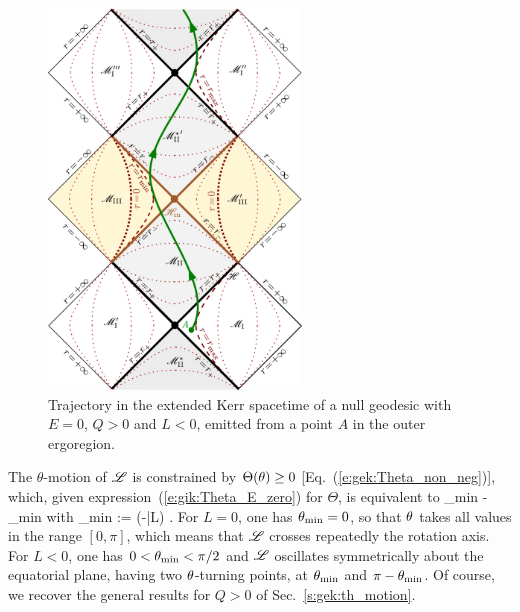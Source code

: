\begin{figure}
\centerline{\includegraphics[width=0.6\textwidth]{gik_zero_ener_traj.pdf}}
\caption[]{\label{f:gik:zero_ener_traj} \footnotesize
Trajectory in the extended Kerr spacetime of a null geodesic
with $E=0$, $Q>0$ and $L<0$, emitted from a point $A$ in the outer ergoregion.
}
\end{figure}

The $\theta$-motion of $\mathscr{L}$ is constrained by $\Theta(\theta) \geq 0$ [Eq.~(\ref{e:gek:Theta_non_neg})],
which, given expression~(\ref{e:gik:Theta_E_zero}) for $\Theta$, is
equivalent to
\be
    \th_{\rm min} \leq \th \leq \pi - \th_{\rm min} \quad\mbox{with}\quad
    \th_{\rm min} := \arctan (-\bar{L}) .
\ee
For $L = 0$, one has $\theta_{\rm min} = 0$, so that $\theta$ takes all values in the
range $[0,\pi]$, which means that $\mathscr{L}$
crosses repeatedly the rotation axis. For $L< 0$, one has $0 < \theta_{\rm min} < \pi/2$ and
$\mathscr{L}$ oscillates symmetrically about the equatorial plane,
having two $\theta$-turning points, at $\theta_{\rm min} $ and $\pi-\theta_{\rm min}$. Of course, we
recover the general results for $Q>0$ of Sec.~\ref{s:gek:th_motion}.


